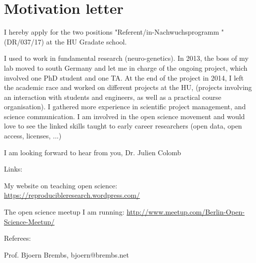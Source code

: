 \section* {Motivation letter}

I hereby apply for the two positions "Referent/in-Nachwuchsprogramm " (DR/037/17) at the HU Gradate school.%

I used to work in fundamental research (neuro-genetics). In 2013, the boss of my lab moved to south Germany and let me in charge of the ongoing project, which involved one PhD student and one TA. At the end of the project in 2014, I left the academic race and worked on different projects at the HU, (projects involving an interaction with students and engineers, as well as a practical course organisation).  I gathered more experience in scientific project management, and science communication. I am involved in the open science movement and would love to see the linked skills taught to early career researchers (open data, open access, licenses, ...)


I am looking forward to hear from you,
Dr. Julien Colomb

\vspace {1cm} 

Links:

My website on teaching open science: \url{https://reproducibleresearch.wordpress.com/}

The open science meetup I am running: \url{http://www.meetup.com/Berlin-Open-Science-Meetup/}



\vspace {0.5cm} 

Referees:

Prof. Bjoern Brembs, bjoern@brembs.net
